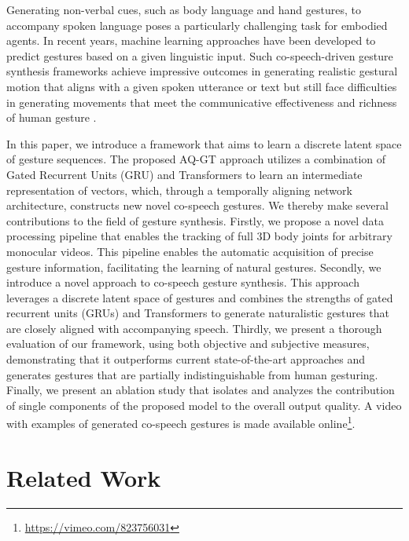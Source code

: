 \documentclass[sigconf]{acmart}
\begin{document}
Generating non-verbal cues, such as body language and hand gestures, to accompany spoken language poses a particularly challenging task for embodied agents. In recent years, machine learning approaches have been developed to predict gestures based on a given linguistic input. Such co-speech-driven gesture synthesis frameworks achieve impressive outcomes in generating realistic gestural motion that aligns with a given spoken utterance or text but still face difficulties in generating movements that meet the communicative effectiveness and richness of human gesture  \cite{nyatsangaComprehensiveReviewDataDriven2023b}.

In this paper, we introduce a framework that aims to learn a discrete latent space of gesture sequences. The proposed AQ-GT approach utilizes a combination of Gated Recurrent Units (GRU) and Transformers to learn an intermediate representation of vectors, which, through a temporally aligning network architecture, constructs new novel co-speech gestures. We thereby make several contributions to the field of gesture synthesis. 
Firstly, we propose a novel data processing pipeline that enables the tracking of full 3D body joints for arbitrary monocular videos. This pipeline enables the automatic acquisition of precise gesture information, facilitating the learning of natural gestures.
Secondly, we introduce a novel approach to co-speech gesture synthesis. This approach leverages a discrete latent space of gestures and combines the strengths of gated recurrent units (GRUs) and Transformers to generate naturalistic gestures that are closely aligned with accompanying speech.
Thirdly, we present a thorough evaluation of our framework, using both objective and subjective measures, demonstrating that it outperforms current state-of-the-art approaches and generates gestures that are partially indistinguishable from human gesturing.
Finally, we present an ablation study that isolates and analyzes the contribution of single components of the proposed model to the overall output quality. A video with examples of generated co-speech gestures is made available online\footnote{\href{https://vimeo.com/823756031}{https://vimeo.com/823756031}}.


\section{Related Work}
\end{document}
